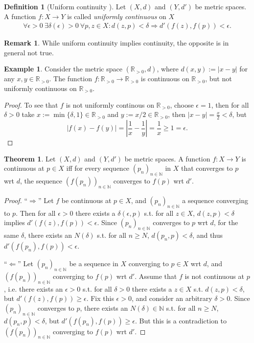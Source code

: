 \documentclass[12pt, a4paper]{article}
\numberwithin{equation}{section}
\theoremstyle{definition}
\theoremstyle{definition}
\newtheorem{defn}[thm]{Definition} %
\newtheorem{exmp}[thm]{Example} %
\newtheorem{remark}[thm]{Remark} %
\newtheorem{theorem}[thm]{Theorem}
\newcommand{\abs}[1]{\left\vert #1 \right\vert}
\newcommand{\seq}[1][\varphi]{\left( #1 \right)_{n \in \mathbb{N}}}
\begin{document}
	\begin{defn}[Uniform continuity \cite{src:uniform_continuity}]
		Let $(X, d)$ and $(Y, d')$ be metric spaces. A function $f: X\rightarrow Y$ is called \textit{uniformly continuous} on $X$
		\begin{align}
			\forall\epsilon > 0\ \exists \delta(\epsilon) > 0\ \forall p, z\in X: d\left(z, p\right) < \delta \Rightarrow d'\left( f\left(z\right), f\left(p\right) \right) < \epsilon.
		\end{align}
	\end{defn}

	\begin{remark}
		While uniform continuity implies continuity, the opposite is in general not true.
	\end{remark}

	\begin{exmp}
		Consider the metric space $(\mathbb R_{> 0}, d)$, where $d(x, y) := \abs{x - y}$ for any $x, y\in\mathbb R_{> 0}$. The function $f: \mathbb R_{>0} \to \mathbb R_{> 0}$ is continuous on $\mathbb R_{> 0}$, but not uniformly continuous on $\mathbb R_{> 0}$. 
	\end{exmp}

	\begin{proof}
		To see that $f$ is not uniformly continous on $\mathbb R_{> 0}$, choose $\epsilon = 1$, then for all $\delta > 0$ take $x := \min\{\delta, 1\}\in\mathbb R_{> 0}$ and $y := x/2\in\mathbb R_{> 0}$, then $\abs{x - y} = \frac{x}{2} < \delta$, but
		$$\abs{f(x) - f(y)} = \abs{\frac{1}{x} - \frac{1}{y}} = \frac{1}{x} \geq 1 = \epsilon.$$
	\end{proof}

	\begin{theorem}
		Let $(X, d)$ and $(Y, d')$ be metric spaces. A function $f: X\to Y$ is continuous at $p\in X$ iff for every sequence $\seq[p_n]$ in $X$ that converges to $p$ wrt $d$, the sequence $\seq[f(p_n)]$ converges to $f(p)$ wrt $d'$.
	\end{theorem}

	\begin{proof}
		\enquote{$\Longrightarrow$} Let $f$ be continuous at $p\in X$, and $\seq[p_n]$ a sequence converging to $p$. Then for all $\epsilon > 0$ there exists a $\delta(\epsilon, p)$ s.t. for all $z\in X$, $d(z, p) < \delta$ implies $d'(f(z), f(p)) < \epsilon$. Since $\seq[p_n]$ converges to $p$ wrt $d$, for the same $\delta$, there exists an $N(\delta)$ s.t. for all $n\geq N$, $d(p_n, p) < \delta$, and thus $d'(f(p_n), f(p)) < \epsilon$.
		
		\enquote{$\Longleftarrow$} Let $\seq[p_n]$ be a sequence in $X$ converging to $p\in X$ wrt $d$, and $\seq[f(p_n)]$ converging to $f(p)$ wrt $d'$. Assume that $f$ is not continuous at $p$, i.e. there exists an $\epsilon > 0$ s.t. for all $\delta > 0$ there exists a $z\in X$ s.t. $d(z, p) < \delta$, but $d'(f(z), f(p)) \geq \epsilon$. Fix this $\epsilon > 0$, and consider an arbitrary $\delta > 0$. Since $\seq[p_n]$ converges to $p$, there exists an $N(\delta)\in\mathbb N$ s.t. for all $n\geq N$, $d(p_n, p) < \delta$, but $d'(f(p_n), f(p)) \geq \epsilon$. But this is a contradiction to $\seq[f(p_n)]$ converging to $f(p)$ wrt $d'$.
	\end{proof}
\end{document}
